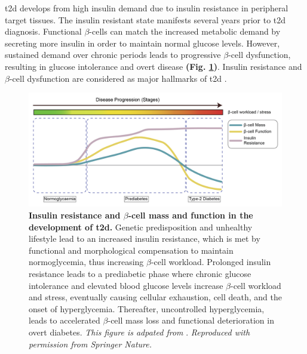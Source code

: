 \gls{t2d} develops from high insulin demand due to insulin resistance in peripheral target tissues. The insulin resistant state manifests several years prior to \gls{t2d} diagnosis. Functional $\beta$-cells can match the increased metabolic demand by secreting more insulin in order to maintain normal glucose levels. However, sustained demand over chronic periods leads to progressive $\beta$-cell dysfunction, resulting in glucose intolerance and overt disease \textbf{(Fig. \ref{fig:chp1_t2d_patho})}. Insulin resistance and $\beta$-cell dysfunction are considered as major hallmarks of \gls{t2d} \textbf{\cite{banday_pathophysiology_2020}}.\\

\begin{figure}[H]
    \centering
    \includegraphics[width=\linewidth]{Chapter1/Fig/F1-3-04.png}
    \caption[Pathogenesis of ]{\textbf{Insulin resistance and $\beta$-cell mass and function in the development of \gls{t2d}.} Genetic predisposition and unhealthy lifestyle lead to an increased insulin resistance, which is met by functional and morphological compensation to maintain normoglycemia, thus increasing $\beta$-cell workload. Prolonged insulin resistance leads to a prediabetic phase where chronic glucose intolerance and elevated blood glucose levels increase $\beta$-cell workload and stress, eventually causing cellular exhaustion, cell death, and the onset of hyperglycemia. Thereafter, uncontrolled hyperglycemia, leads to accelerated $\beta$-cell mass loss and functional deterioration in overt diabetes. \textit{This figure is adpated from }\textbf{\cite{chen_human_2017}}.\textit{ Reproduced with permission from Springer Nature.}}
    \label{fig:chp1_t2d_patho}
\end{figure}

